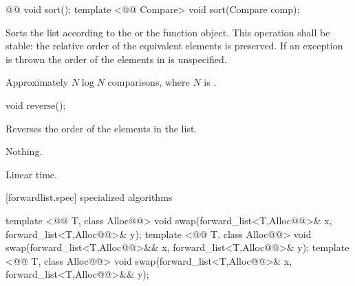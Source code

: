 \documentclass[american,twoside]{book}
\begin{document}
\begin{itemdecl}
@@ void sort();
template <@@ Compare> void sort(Compare comp);
\end{itemdecl}

\begin{itemdescr}
\pnum
{}

\pnum
\effects Sorts the list according to the  or the  function object. This operation shall be stable: the relative order of the equivalent elements is preserved. If an exception is thrown the order of the elements in  is unspecified.

\pnum
\complexity Approximately $N \log N$ comparisons, where $N$ is .
\end{itemdescr}

\begin{itemdecl}
void reverse();
\end{itemdecl}

\begin{itemdescr}
\pnum
\effects Reverses the order of the elements in the list.

\pnum
\throws Nothing.

\pnum
\complexity Linear time.
\end{itemdescr}

[forwardlist.spec]{ specialized algorithms}

\begin{itemdecl}
template <@@ T, class Alloc@@>
  void swap(forward_list<T,Alloc@@>& x, forward_list<T,Alloc@@>& y);
template <@@ T, class Alloc@@>
  void swap(forward_list<T,Alloc@@>&& x, forward_list<T,Alloc@@>& y);
template <@@ T, class Alloc@@>
  void swap(forward_list<T,Alloc@@>& x, forward_list<T,Alloc@@>&& y);
\end{itemdecl}

\begin{itemdescr}
\pnum
\effects {}
\end{itemdescr}
\end{document}
